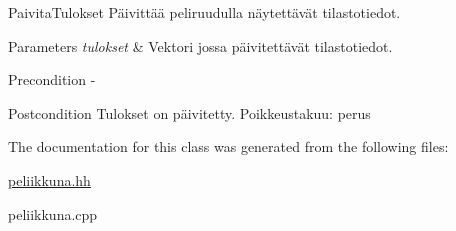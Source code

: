 Paivita\-Tulokset Päivittää peliruudulla näytettävät tilastotiedot. 


\begin{DoxyParams}{Parameters}
{\em tulokset} & Vektori jossa päivitettävät tilastotiedot. \\
\hline
\end{DoxyParams}
\begin{DoxyPrecond}{Precondition}
-\/ 
\end{DoxyPrecond}
\begin{DoxyPostcond}{Postcondition}
Tulokset on päivitetty. Poikkeustakuu\-: perus 
\end{DoxyPostcond}


The documentation for this class was generated from the following files\-:\begin{DoxyCompactItemize}
\item 
\hyperlink{peliikkuna_8hh}{peliikkuna.\-hh}\item 
peliikkuna.\-cpp\end{DoxyCompactItemize}
